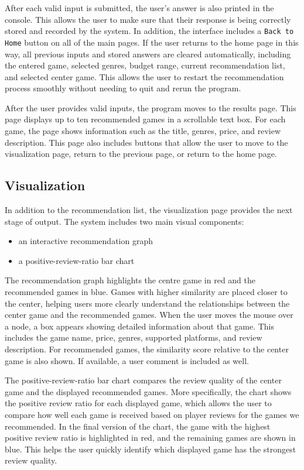\documentclass[fontsize=11pt]{article}
\begin{document}
After each valid input is submitted, the user’s answer is also printed in the console. This allows the user to make sure that their response is being correctly stored and recorded by the system. In addition, the interface includes a \texttt{Back to Home} button on all of the main pages. If the user returns to the home page in this way, all previous inputs and stored answers are cleared automatically, including the entered game, selected genres, budget range, current recommendation list, and selected center game. This allows the user to restart the recommendation process smoothly without needing to quit and rerun the program.

After the user provides valid inputs, the program moves to the results page. This page displays up to ten recommended games in a scrollable text box. For each game, the page shows information such as the title, genres, price, and review description. This page also includes buttons that allow the user to move to the visualization page, return to the previous page, or return to the home page.

\newpage

\subsection{Visualization}

In addition to the recommendation list, the visualization page provides the next stage of output. The system includes two main visual components:
\begin{itemize}
    \item an interactive recommendation graph
    \item a positive-review-ratio bar chart
\end{itemize}

The recommendation graph highlights the centre game in red and the recommended games in blue. Games with higher similarity are placed closer to the center, helping users more clearly understand the relationships between the center game and the recommended games. When the user moves the mouse over a node, a box appears showing detailed information about that game. This includes the game name, price, genres, supported platforms, and review description. For recommended games, the similarity score relative to the center game is also shown. If available, a user comment is included as well.

The positive-review-ratio bar chart compares the review quality of the center game and the displayed recommended games. More specifically, the chart shows the positive review ratio for each displayed game, which allows the user to compare how well each game is received based on player reviews for the games we recommended. In the final version of the chart, the game with the highest positive review ratio is highlighted in red, and the remaining games are shown in blue. This helps the user quickly identify which displayed game has the strongest review quality.
\end{document}
